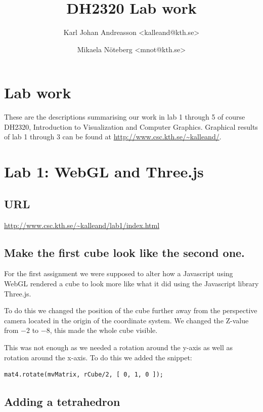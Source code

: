 \documentclass[a4paper]{article}
\title{DH2320 Lab work}
\author{Karl Johan Andreasson <{kalleand@kth.se}> %
\and Mikaela N\"oteberg <{mnot@kth.se}>
}
\begin{document}
\thispagestyle{empty}
\maketitle
\thispagestyle{empty}
\pagestyle{empty}
\newpage
\pagestyle{fancy}
\setcounter{page}{1}

\section*{Lab work}
These are the descriptions summarising our work in lab 1 through 5 of course DH2320, Introduction to Visualization and Computer Graphics. Graphical results of lab 1 through 3 can be found at \url{http://www.csc.kth.se/~kalleand/}.

\section{Lab 1: WebGL and Three.js}

\subsection*{URL}
\url{http://www.csc.kth.se/~kalleand/lab1/index.html}

\subsection{Make the first cube look like the second one.}

For the first assignment we were supposed to alter how a Javascript using WebGL rendered a
cube to look more like what it did using the Javascript library Three.js.

To do this we changed the position of the cube further away from the perspective
camera located in the origin of the coordinate system. We changed the Z-value
from $-2$ to $-8$, this made the whole cube visible.

This was not enough as we needed a rotation around the y-axis as well as
rotation around the x-axis. To do this we added the snippet:

\begin{verbatim}
mat4.rotate(mvMatrix, rCube/2, [ 0, 1, 0 ]);
\end{verbatim}

\subsection{Adding a tetrahedron}
\end{document}
